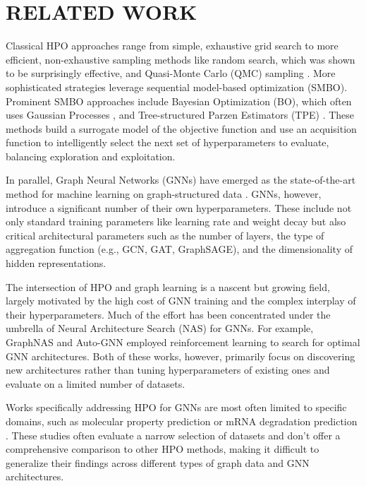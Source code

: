\section{\uppercase{Related work}}\label{sec:related-work}

Classical HPO approaches range from simple, exhaustive grid search to more efficient, non-exhaustive sampling methods like random search, which was shown to be surprisingly effective, and Quasi-Monte Carlo (QMC) sampling \cite{bergstra_random_2012}. More sophisticated strategies leverage sequential model-based optimization (SMBO). Prominent SMBO approaches include Bayesian Optimization (BO), which often uses Gaussian Processes \cite{snoek_practical_2012}, and Tree-structured Parzen Estimators (TPE) \cite{bergstra_algorithms_2011}. These methods build a surrogate model of the objective function and use an acquisition function to intelligently select the next set of hyperparameters to evaluate, balancing exploration and exploitation.

In parallel, Graph Neural Networks (GNNs) have emerged as the state-of-the-art method for machine learning on graph-structured data \cite{kipf_semi-supervised_2017}. GNNs, however, introduce a significant number of their own hyperparameters. These include not only standard training parameters like learning rate and weight decay but also critical architectural parameters such as the number of layers, the type of aggregation function (e.g., GCN, GAT, GraphSAGE), and the dimensionality of hidden representations.

The intersection of HPO and graph learning is a nascent but growing field, largely motivated by the high cost of GNN training and the complex interplay of their hyperparameters. Much of the effort has been concentrated under the umbrella of Neural Architecture Search (NAS) for GNNs. For example, GraphNAS \cite{gao_graph_2020} and Auto-GNN \cite{zhou_auto-gnn_2022} employed reinforcement learning to search for optimal GNN architectures. Both of these works, however, primarily focus on discovering new architectures rather than tuning hyperparameters of existing ones and evaluate on a limited number of datasets.

Works specifically addressing HPO for GNNs are most often limited to specific domains, such as molecular property prediction \cite{yuan_genetic_2021, yuan_systematic_2021, yuan_which_2021, ebadi_hyperparameter_2025} or mRNA degradation prediction \cite{vodilovska_hyperparameter_2023}. These studies often evaluate a narrow selection of datasets and don't offer a comprehensive comparison to other HPO methods, making it difficult to generalize their findings across different types of graph data and GNN architectures.
